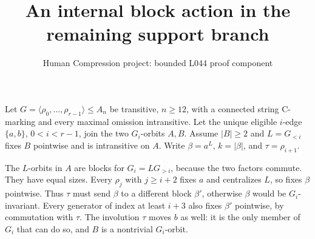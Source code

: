 \documentclass[11pt,a4paper]{article}
\title{An internal block action in the remaining support branch}
\author{Human Compression project: bounded L044 proof component}
\date{}
\newcommand{\gen}[1]{\langle#1\rangle}
\begin{document}
\maketitle
Let $G=\gen{\rho_0,\ldots,\rho_{r-1}}\leq A_n$ be transitive,
$n\geq12$, with a connected string C-marking and every maximal
omission intransitive. Let the unique eligible $i$-edge
$\{a,b\}$, $0<i<r-1$, join the two $G_i$-orbits $A,B$.
Assume $|B|\geq2$ and $L=G_{<i}$ fixes $B$ pointwise and is intransitive on $A$.
Write $\beta=a^L$, $k=|\beta|$, and $\tau=\rho_{i+1}$.

The $L$-orbits in $A$ are blocks for $G_i=L G_{>i}$, because
the two factors commute. They have equal sizes. Every
$\rho_j$ with $j\geq i+2$ fixes $a$ and centralizes $L$, so
fixes $\beta$ pointwise. Thus $\tau$ must send $\beta$ to
a different block $\beta'$, otherwise $\beta$ would be
$G_i$-invariant. Every generator of index at least $i+3$
also fixes $\beta'$ pointwise, by commutation with $\tau$.
The involution $\tau$ moves $b$ as well: it is the only
member of $G_i$ that can do so, and $B$ is a nontrivial $G_i$-orbit.
\end{document}
